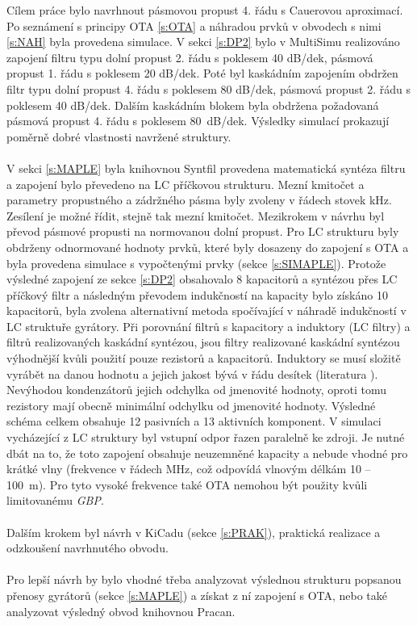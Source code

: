\noindent Cílem práce bylo navrhnout pásmovou propust 4. řádu s Cauerovou aproximací. Po seznámení s principy OTA \ref{s:OTA} a náhradou prvků v obvodech s nimi \ref{s:NAH} byla provedena simulace. V sekci \ref{s:DP2} bylo v MultiSimu realizováno zapojení filtru typu dolní propust 2. řádu s poklesem 40 dB/dek, pásmová propust 1. řádu s poklesem 20 dB/dek. Poté byl kaskádním zapojením obdržen filtr typu dolní propust 4. řádu s poklesem 80 dB/dek, pásmová propust 2. řádu s poklesem 40 dB/dek. Dalším kaskádním blokem byla obdržena požadovaná pásmová propust 4. řádu s poklesem 80~dB/dek. Výsledky simulací prokazují poměrně dobré vlastnosti navržené struktury.\\
\\
V sekci \ref{s:MAPLE} byla knihovnou Syntfil provedena matematická syntéza filtru a zapojení bylo převedeno na LC příčkovou strukturu. Mezní kmitočet a parametry propustného a zádržného pásma byly zvoleny v řádech stovek kHz. Zesílení je možné řídit, stejně tak mezní kmitočet. Mezikrokem v návrhu byl převod pásmové propusti na normovanou dolní propust. Pro LC strukturu byly obdrženy odnormované hodnoty prvků, které byly dosazeny do zapojení s OTA a byla provedena simulace s vypočtenými prvky (sekce \ref{s:SIMAPLE}). Protože výsledné zapojení ze sekce \ref{s:DP2} obsahovalo 8 kapacitorů a syntézou přes LC příčkový filtr a následným převodem indukčností na kapacity bylo získáno 10 kapacitorů, byla zvolena alternativní metoda spočívající v náhradě indukčností v LC struktuře gyrátory. Při porovnání filtrů s kapacitory a induktory (LC filtry) a filtrů realizovaných kaskádní syntézou, jsou filtry realizované kaskádní syntézou výhodnější kvůli použití pouze rezistorů a kapacitorů. Induktory se musí složitě vyrábět na danou hodnotu a jejich jakost bývá v řádu desítek (literatura \cite{18}). Nevýhodou kondenzátorů jejich odchylka od jmenovité hodnoty, oproti tomu rezistory mají obecně minimální odchylku od jmenovité hodnoty. Výsledné schéma celkem obsahuje 12 pasivních a 13 aktivních komponent. V simulaci vycházející z LC struktury byl vstupní odpor řazen paralelně ke zdroji. Je nutné dbát na to, že toto zapojení obsahuje neuzemněné kapacity a nebude vhodné pro krátké vlny (frekvence v řádech MHz, což odpovídá vlnovým délkám 10 -- 100~m). Pro tyto vysoké frekvence také OTA nemohou být použity kvůli limitovanému \textit{GBP}. \\
\\
Dalším krokem byl návrh v KiCadu (sekce \ref{s:PRAK}), praktická realizace a odzkoušení navrhnutého obvodu.\\
\\
Pro lepší návrh by bylo vhodné třeba analyzovat výslednou strukturu popsanou přenosy gyrátorů (sekce \ref{s:MAPLE}) a získat z ní zapojení s OTA, nebo také analyzovat výsledný obvod knihovnou Pracan.